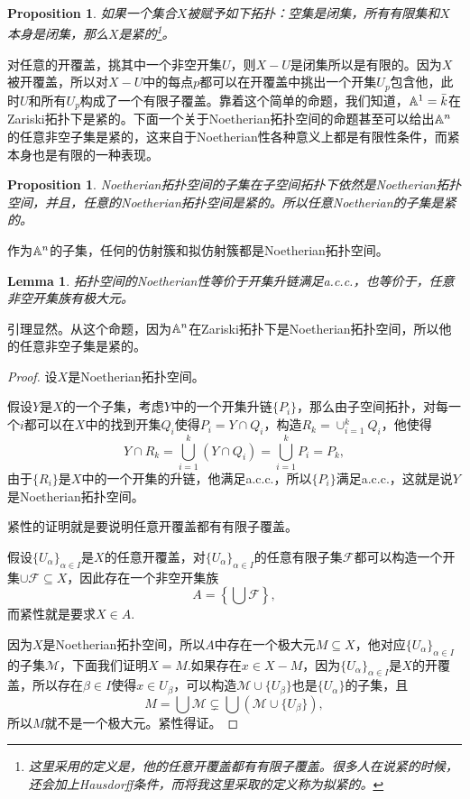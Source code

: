 \documentclass[9pt]{extbook}
\theoremstyle{plain}%
\newtheorem{pro}[defi]{Proposition}%
\newtheorem{lem}[defi]{Lemma}%
\begin{document}
\begin{pro}
如果一个集合$X$被赋予如下拓扑：空集是闭集，所有有限集和$X$本身是闭集，那么$X$是紧的\footnote{这里采用的定义是，他的任意开覆盖都有有限子覆盖。很多人在说紧的时候，还会加上Hausdorff条件，而将我这里采取的定义称为拟紧的。}。
\end{pro}
对任意的开覆盖，挑其中一个非空开集$U$，则$X-U$是闭集所以是有限的。因为$X$被开覆盖，所以对$X-U$中的每点$p$都可以在开覆盖中挑出一个开集$U_p$包含他，此时$U$和所有$U_p$构成了一个有限子覆盖。靠着这个简单的命题，我们知道，$\mathbb{A}^1=\bar{k}$在Zariski拓扑下是紧的。下面一个关于Noetherian拓扑空间的命题甚至可以给出$\mathbb{A}^n$的任意非空子集是紧的，这来自于Noetherian性各种意义上都是有限性条件，而紧本身也是有限的一种表现。
\begin{pro}
	Noetherian拓扑空间的子集在子空间拓扑下依然是Noetherian拓扑空间，并且，任意的Noetherian拓扑空间是紧的。所以任意Noetherian的子集是紧的。
\end{pro}
作为$\mathbb{A}^n$的子集，任何的仿射簇和拟仿射簇都是Noetherian拓扑空间。
\begin{lem}
	拓扑空间的Noetherian性等价于开集升链满足a.c.c.，也等价于，任意非空开集族有极大元。
\end{lem}
引理显然。从这个命题，因为$\mathbb{A}^n$在Zariski拓扑下是Noetherian拓扑空间，所以他的任意非空子集是紧的。
\begin{proof}
	设$X$是Noetherian拓扑空间。

	假设$Y$是$X$的一个子集，考虑$Y$中的一个开集升链$\{P_i\}$，那么由子空间拓扑，对每一个$i$都可以在$X$中的找到开集$Q_i$使得$P_i=Y\cap Q_i$，构造$R_k=\cup_{i=1}^k Q_i$，他使得
	\[
	Y\cap R_k=\bigcup_{i=1}^k (Y \cap Q_i)=\bigcup_{i=1}^k P_i=P_k,
	\]
	由于$\{R_i\}$是$X$中的一个开集的升链，他满足a.c.c.，所以$\{P_i\}$满足a.c.c.，这就是说$Y$是Noetherian拓扑空间。

	紧性的证明就是要说明任意开覆盖都有有限子覆盖。

	假设$\{U_\alpha\}_{\alpha\in I}$是$X$的任意开覆盖，对$\{U_\alpha\}_{\alpha\in I}$的任意有限子集$\mathscr{F}$都可以构造一个开集$\cup \mathscr{F}\subseteq X$，因此存在一个非空开集族
	\[
		A=\left\{\bigcup \mathscr{F}\right\},
	\]
	而紧性就是要求$X\in A$.

	因为$X$是Noetherian拓扑空间，所以$A$中存在一个极大元$M\subseteq X$，他对应$\{U_\alpha\}_{\alpha\in I}$的子集$\mathscr{M}$，下面我们证明$X=M$.如果存在$x\in X-M$，因为$\{U_\alpha\}_{\alpha\in I}$是$X$的开覆盖，所以存在$\beta \in I$使得$x\in U_\beta$，可以构造$\mathscr{M}\cup\{U_\beta\}$也是$\{U_\alpha\}$的子集，且
	\[
		M=\bigcup \mathscr{M}\subsetneq \bigcup\left(\mathscr{M}\cup\{U_\beta\}\right),
	\]
	所以$M$就不是一个极大元。紧性得证。
\end{proof}
\end{document}
